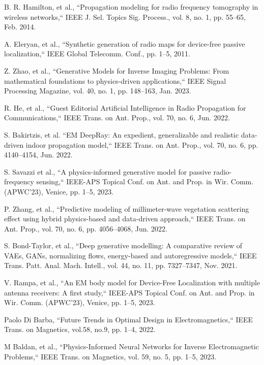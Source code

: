\begin{thebibliography}{10}
B. R. Hamilton, et al., ``Propagation modeling for radio frequency tomography in wireless networks,`` IEEE J. Sel. Topics Sig. Process., vol. 8, no. 1, pp. 55--65, Feb. 2014.

A. Eleryan, et al., ``Synthetic generation of radio maps for device-free passive localization,`` IEEE Global Telecomm. Conf., pp. 1--5, 2011.

Z. Zhao, et al., ``Generative Models for Inverse Imaging Problems: From mathematical foundations to physics-driven applications,`` IEEE Signal Processing Magazine, vol. 40, no. 1, pp. 148--163, Jan. 2023.

R. He, et al., ``Guest Editorial Artificial Intelligence in Radio Propagation for Communications,`` IEEE Trans. on Ant. Prop., vol. 70, no. 6, Jun. 2022.

S. Bakirtzis, et al. ``EM DeepRay: An expedient, generalizable and realistic data-driven indoor propagation model,`` IEEE Trans. on Ant. Prop., vol. 70, no. 6, pp. 4140--4154, Jun. 2022.

S. Savazzi et al., ``A physics-informed generative model for passive radio-frequency sensing,`` IEEE-APS Topical Conf. on Ant. and Prop. in Wir. Comm. (APWC'23), Venice, pp. 1--5, 2023.

P. Zhang, et al., ``Predictive modeling of millimeter-wave vegetation scattering effect using hybrid physics-based and data-driven approach,`` IEEE Trans. on Ant. Prop., vol. 70, no. 6, pp. 4056--4068, Jun. 2022.

S. Bond-Taylor, et al., ``Deep generative modelling: A comparative review of VAEs, GANs, normalizing flows, energy-based and autoregressive models,`` IEEE Trans. Patt. Anal. Mach. Intell., vol. 44, no. 11, pp. 7327--7347, Nov. 2021.

V. Rampa, et al., ``An EM body model for Device-Free Localization with multiple antenna receivers: A first study,`` IEEE-APS Topical Conf. on Ant. and Prop. in Wir. Comm. (APWC'23), Venice, pp. 1--5, 2023.

Paolo Di Barba, ``Future Trends in Optimal Design in Electromagnetics,`` IEEE Trans. on Magnetics, vol.58, no.9, pp. 1--4, 2022.

M Baldan, et al., ``Physics-Informed Neural Networks for Inverse Electromagnetic Problems,`` IEEE Trans. on Magnetics, vol. 59, no. 5, pp. 1--5, 2023.


\end{thebibliography}
